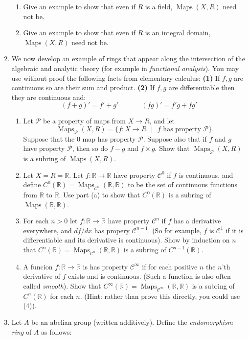 \documentclass[11pt]{article}
\newcommand{\maps}{\operatorname{Maps}}
\newcommand{\bR}{\mathbb{R}}
\newcommand{\sC}{\mathscr{C}}
\newcommand{\sP}{\mathscr{P}}
\begin{document}
\begin{enumerate}
{\begin{enumerate}
{    }
    \item{
    Give an example to show that even if $R$ is a field, $\maps(X,R)$ need not be.
    }
    \item{
    Give an example to show that even if $R$ is an integral domain, $\maps(X,R)$ need not be.
    }
  \end{enumerate}
  }
  \item{
  We now develop an example of rings that appear along the intersection of the algebraic and analytic theory (for example in \textit{functional analysis}).  You may use without proof the following facts from elementary calculus: \textbf{(1)} If $f,g$ are continuous so are their sum and product.  \textbf{(2)} If $f,g$ are differentiable then they are continuous and:
  \[(f+g)' = f'+g'\hspace{40pt}(fg)' = f'g+fg'\]
  \begin{enumerate}
    \item{
    Let $\sP$ be a property of maps from $X\to R$, and let
    \[\maps_\sP(X,R) = \{f:X\to R\text{ }|\text{ }f\text{ has property }\sP\}.\]
    Suppose that the 0 map has property $\sP$.  Suppose also that if $f$ and $g$ have property $\sP$, then so do $f-g$ and $f\times g$.  Show that $\maps_\sP(X,R)$ is a subring of $\maps(X,R)$.
    }
    \item{
    Let $X = R = \bR$.  Let $f:\bR\to\bR$ have property $\sC^0$ if $f$ is continuous, and define $C^0(\bR) = \maps_{\sC^0}(\bR,\bR)$ to be the set of continuous functions from $\bR$ to $\bR$.  Use part (a) to show that $C^0(\bR)$ is a subring of $\maps(\bR,\bR)$.
    }
    \item{
    For each $n>0$ let $f:\bR\to\bR$ have property $\sC^n$ if $f$ has a derivative everywhere, and $df/dx$ has propery $\sC^{n-1}$.  (So for example, $f$ is $\sC^1$ if it is differentiable and its derivative is continuous). Show by induction on $n$ that $C^n(\bR) = \maps_{\sC^n}(\bR,\bR)$ is a subring of $C^{n-1}(\bR)$.
    }
    \item{
    A funcion $f:\bR\to\bR$ is has property $\sC^\infty$ if for each positive $n$ the $n$'th derivative of $f$ exists and is continuous.  (Such a function is also often called \textit{smooth}).  Show that $C^\infty(\bR) = \maps_{\sC^{\infty}}(\bR,\bR)$ is a subring of $C^{n}(\bR)$ for each $n$.  (Hint: rather than prove this directly, you could use (4)).
    }
  \end{enumerate}
  }
  \item{
  Let $A$ be an abelian group (written additively).  Define the \textit{endomorphism ring} of $A$ as follows:
}
\end{enumerate}
\end{document}

